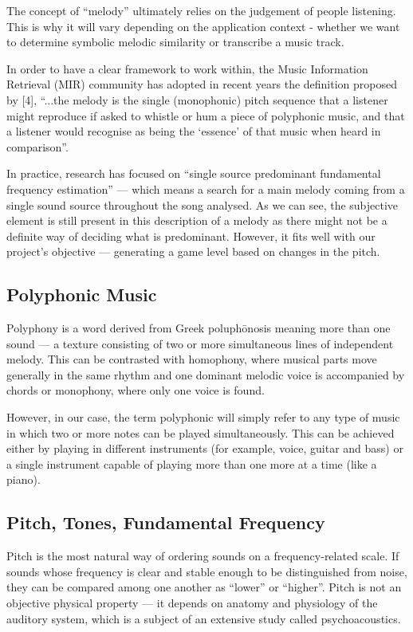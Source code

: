 The concept of “melody” ultimately relies on the judgement of people listening. This is why it will vary depending on the application context - whether we want to determine symbolic melodic similarity or transcribe a music track. 

In order to have a clear framework to work within, the Music Information Retrieval (MIR) community has adopted in recent years the definition proposed by [4], “...the melody is the single (monophonic) pitch sequence that a listener might reproduce if asked to whistle or hum a piece of polyphonic music, and that a listener would recognise as being the ‘essence’ of that music when heard in comparison”.

In practice, research has focused on “single source predominant fundamental frequency estimation” — which means a search for a main melody coming from a single sound source throughout the song analysed. As we can see, the subjective element is still present in this description of a melody as there might not be a definite way of deciding what is predominant. However, it fits well with our project’s objective — generating a game level based on changes in the pitch.


\subsection{Polyphonic Music}

Polyphony is a word derived from Greek poluph\={o}nosis meaning more than one sound — a texture consisting of two or more simultaneous lines of independent melody. This can be contrasted with homophony, where musical parts move generally in the same rhythm and one dominant melodic voice is accompanied by chords or monophony, where only one voice is found. 

However, in our case, the term polyphonic will simply refer to any type of music in which two or more notes can be played simultaneously. This can be achieved either by playing in different instruments (for example, voice, guitar and bass) or a single instrument capable of playing more than one more at a time (like a piano).


\subsection{Pitch, Tones, Fundamental Frequency}

Pitch is the most natural way of ordering sounds on a frequency-related scale. If sounds whose frequency is clear and stable enough to be distinguished from noise, they can be compared among  one another as “lower” or “higher”. Pitch is not an objective physical property — it depends on anatomy and physiology of the auditory system, which is a subject of an extensive study called psychoacoustics. 

